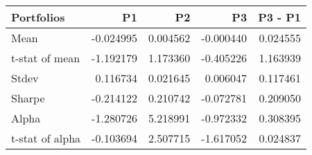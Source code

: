 \begin{tabular}{lrrrr}
\toprule
Portfolios & P1 & P2 & P3 & P3 - P1 \\
\midrule
Mean & -0.024995 & 0.004562 & -0.000440 & 0.024555 \\
t-stat of mean & -1.192179 & 1.173360 & -0.405226 & 1.163939 \\
Stdev & 0.116734 & 0.021645 & 0.006047 & 0.117461 \\
Sharpe & -0.214122 & 0.210742 & -0.072781 & 0.209050 \\
Alpha & -1.280726 & 5.218991 & -0.972332 & 0.308395 \\
t-stat of alpha & -0.103694 & 2.507715 & -1.617052 & 0.024837 \\
\bottomrule
\end{tabular}
